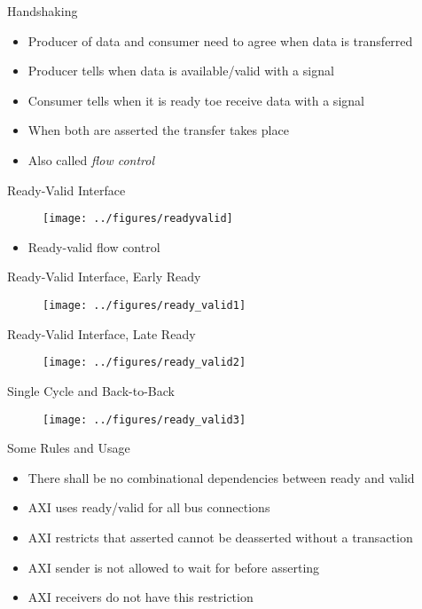 \begin{frame}[fragile]{Handshaking}
\begin{itemize}
\item Producer of data and consumer need to agree when data is transferred
\item Producer tells when data is available/valid with a  signal
\item Consumer tells when it is ready toe receive data with a  signal
\item When both are asserted the transfer takes place
\item Also called \emph{flow control}
\end{itemize}
\end{frame}

\begin{frame}[fragile]{Ready-Valid Interface}
\begin{figure}
  \texttt{[image: ../figures/readyvalid]}
\end{figure}
\begin{itemize}
\item Ready-valid flow control
\end{itemize}
\end{frame}

\begin{frame}[fragile]{Ready-Valid Interface, Early Ready}
\begin{figure}
  \texttt{[image: ../figures/ready\_valid1]}
\end{figure}
\end{frame}

\begin{frame}[fragile]{Ready-Valid Interface, Late Ready}
\begin{figure}
  \texttt{[image: ../figures/ready\_valid2]}
\end{figure}
\end{frame}

\begin{frame}[fragile]{Single Cycle and Back-to-Back}
\begin{figure}
  \texttt{[image: ../figures/ready\_valid3]}
\end{figure}
\end{frame}

\begin{frame}[fragile]{Some Rules and Usage}
\begin{itemize}
\item There shall be no combinational dependencies between ready and valid
\item AXI uses ready/valid for all bus connections
\item AXI restricts that  asserted cannot be deasserted without a transaction
\item AXI sender is not allowed to wait for  before asserting 
\item AXI receivers do not have this restriction
\end{itemize}
\end{frame}


